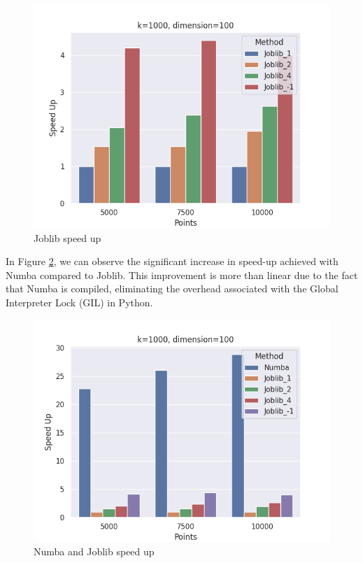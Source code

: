 \documentclass[10pt,twocolumn,letterpaper]{article}
\begin{document}
\begin{figure}[H]
	\caption{Joblib speed up}
	\centering
	\label{fig:joblib}
	\includegraphics[scale=0.5]{../plots/JoblibSpeedUp.png}
\end{figure}

In Figure \ref{fig:numba}, we can observe the significant increase in speed-up achieved with Numba compared to Joblib. This improvement is more than linear due to the fact that Numba is compiled, eliminating the overhead associated with the Global Interpreter Lock (GIL) in Python.

\begin{figure}[H]
	\caption{Numba and Joblib speed up}
	\centering
	\label{fig:numba}
	\includegraphics[scale=0.5]{../plots/numbaJoblibSpeedUp.png}
\end{figure}

{\small
	
	
}
\end{document}
